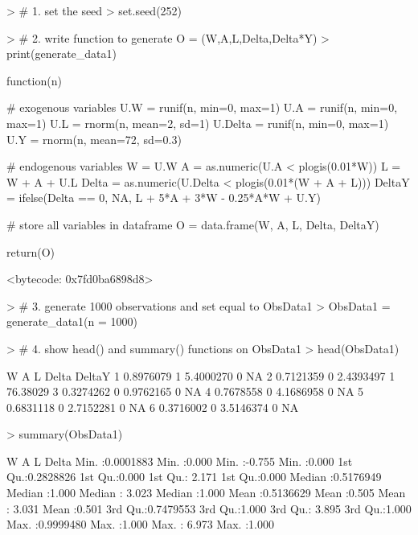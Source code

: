 \documentclass{exam}
\begin{document}
\begin{solution}


\begin{Schunk}
\begin{Sinput}
> # 1. set the seed
> set.seed(252)
\end{Sinput}
\end{Schunk}

\begin{Schunk}
\begin{Sinput}
> # 2. write function to generate O = (W,A,L,Delta,Delta*Y)
> print(generate_data1)
\end{Sinput}
\begin{Soutput}
function(n) {
  
  # exogenous variables
  U.W = runif(n, min=0, max=1)
  U.A = runif(n, min=0, max=1)
  U.L = rnorm(n, mean=2, sd=1)
  U.Delta = runif(n, min=0, max=1)
  U.Y = rnorm(n, mean=72, sd=0.3)
  
  # endogenous variables
  W = U.W
  A = as.numeric(U.A < plogis(0.01*W))
  L = W + A + U.L
  Delta = as.numeric(U.Delta < plogis(0.01*(W + A + L)))
  DeltaY = ifelse(Delta == 0, NA, L + 5*A + 3*W - 0.25*A*W + U.Y)
  
  # store all variables in dataframe
  O = data.frame(W, A, L, Delta, DeltaY)
  
  return(O)
}
<bytecode: 0x7fd0ba6898d8>
\end{Soutput}
\end{Schunk}

\begin{Schunk}
\begin{Sinput}
> # 3. generate 1000 observations and set equal to ObsData1
> ObsData1 = generate_data1(n = 1000)
\end{Sinput}
\end{Schunk}

\begin{Schunk}
\begin{Sinput}
> # 4. show head() and summary() functions on ObsData1
> head(ObsData1)
\end{Sinput}
\begin{Soutput}
          W A         L Delta   DeltaY
1 0.8976079 1 5.4000270     0       NA
2 0.7121359 0 2.4393497     1 76.38029
3 0.3274262 0 0.9762165     0       NA
4 0.7678558 0 4.1686958     0       NA
5 0.6831118 0 2.7152281     0       NA
6 0.3716002 0 3.5146374     0       NA
\end{Soutput}
\begin{Sinput}
> summary(ObsData1)
\end{Sinput}
\begin{Soutput}
       W                   A               L              Delta      
 Min.   :0.0001883   Min.   :0.000   Min.   :-0.755   Min.   :0.000  
 1st Qu.:0.2828826   1st Qu.:0.000   1st Qu.: 2.171   1st Qu.:0.000  
 Median :0.5176949   Median :1.000   Median : 3.023   Median :1.000  
 Mean   :0.5136629   Mean   :0.505   Mean   : 3.031   Mean   :0.501  
 3rd Qu.:0.7479553   3rd Qu.:1.000   3rd Qu.: 3.895   3rd Qu.:1.000  
 Max.   :0.9999480   Max.   :1.000   Max.   : 6.973   Max.   :1.000  
                                                                     

\end{Soutput}
\end{Schunk}
\end{solution}
\end{document}
